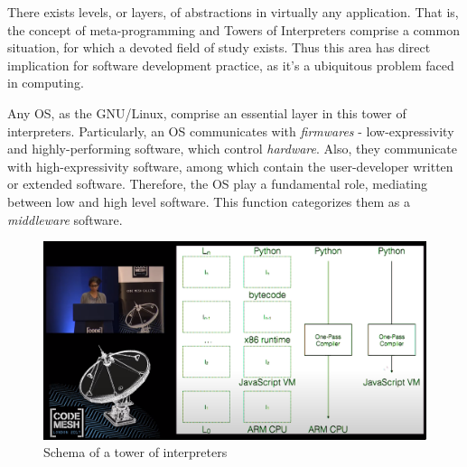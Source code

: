 \documentclass[
12pt,				%
openright,			%
oneside,			%
a4paper,			%
brazil,				%
english,			%
]{abntex2}
\begin{document}
There exists levels, or layers, of abstractions in virtually any
application. That is, the concept of meta-programming and Towers of
Interpreters comprise a common situation, for which a devoted field of
study exists. Thus this area has direct implication for software
development practice, as it's a ubiquitous problem faced in computing.

Any OS, as the GNU/Linux, comprise an essential layer in this tower of
interpreters. Particularly, an OS communicates with \textit{firmwares}
- low-expressivity and highly-performing software, which control
\textit{hardware}. Also, they communicate with high-expressivity
software, among which contain the user-developer written or extended
software. Therefore, the OS play a fundamental role, mediating between
low and high level software. This function categorizes them as a
\textit{middleware} software.     

\begin{figure}[ht]
  \centering
  \caption{\label{fig:tower} Schema of a tower of interpreters}
  \includegraphics[width=\linewidth]{torres.png}
\end{figure}
\end{document}
